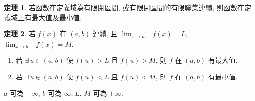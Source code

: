 \documentclass[12pt]{extarticle}
\newcommand{\ds}{\displaystyle}
\theoremstyle{definition}
\newtheorem*{thm}{定理}
\begin{document}
\begin{thm}
  若函數在定義域為{\color{M4}有限閉區間}, 或{\color{M4}有限閉區間的有限聯集}連續, 則函數在定義域上有最大值及最小值. 
\end{thm}

\begin{thm}
  若 $f(x)$ 在 $(a, b)$ 連續, 且 $\ds\lim_{x\to a+}f(x) = L$, $\ds\lim_{x\to b-}f(x) = M$. 
  \begin{enumerate}\setlength\itemsep{0em}
    \item 若 $\exists\,u\in(a, b)$ 使 $f(u) > L$ 且 $f(u) > M$, 則 $f$ 在 $(a, b)$ 有最大值. 
    \item 若 $\exists\,u\in(a, b)$ 使 $f(u) < L$ 且 $f(u) < M$, 則 $f$ 在 $(a, b)$ 有最小值. 
  \end{enumerate}
  $a$ 可為 $-\infty$, $b$ 可為 $\infty$, $L$, $M$ 可為 $\pm\infty$. 
\end{thm}
\end{document}
